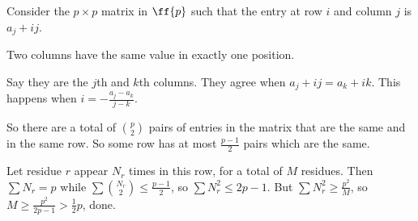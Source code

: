 Consider the $p\times p$ matrix in $\ff{p}$ such that the entry at row $i$ and column $j$ is $a_j+ij$.

\begin{claim}
Two columns have the same value in exactly one position.
\end{claim}

\begin{lemmaproof}
Say they are the $j$th and $k$th columns. They agree when $a_j+ij=a_k+ik$. This happens when $i=-\frac{a_j-a_k}{j-k}$.
\end{lemmaproof}

So there are a total of $\binom{p}{2}$ pairs of entries in the matrix that are the same and in the same row. So some row has at most $\frac{p-1}{2}$ pairs which are the same.

Let residue $r$ appear $N_r$ times in this row, for a total of $M$ residues. Then $\displaystyle\sum N_r=p$ while $\displaystyle\sum\binom{N_r}{2}\leq\frac{p-1}{2}$, so $\displaystyle\sum N_r^2\leq2p-1$. But $\displaystyle\sum N_r^2\geq\frac{p^2}{M}$, so $M\geq\frac{p^2}{2p-1}>\frac{1}{2}p$, done.